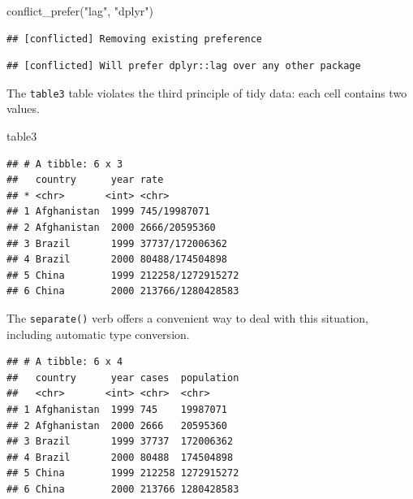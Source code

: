 \documentclass[]{book}
\newenvironment{Shaded}{}{}
\newcommand{\DataTypeTok}[1]{#1}
\newcommand{\KeywordTok}[1]{\textcolor[rgb]{0.00,0.00,1.00}{#1}}
\newcommand{\NormalTok}[1]{#1}
\newcommand{\OperatorTok}[1]{#1}
\newcommand{\StringTok}[1]{\textcolor[rgb]{0.00,0.50,0.50}{#1}}
\begin{document}
\begin{Shaded}
\begin{Highlighting}[]
\KeywordTok{conflict_prefer}\NormalTok{(}\StringTok{"lag"}\NormalTok{, }\StringTok{"dplyr"}\NormalTok{)}
\end{Highlighting}
\end{Shaded}

\begin{verbatim}
## [conflicted] Removing existing preference
\end{verbatim}

\begin{verbatim}
## [conflicted] Will prefer dplyr::lag over any other package
\end{verbatim}

The \texttt{table3} table violates the third principle of tidy data: each cell contains two values.

\begin{Shaded}
\begin{Highlighting}[]
\NormalTok{table3}
\end{Highlighting}
\end{Shaded}

\begin{verbatim}
## # A tibble: 6 x 3
##   country      year rate             
## * <chr>       <int> <chr>            
## 1 Afghanistan  1999 745/19987071     
## 2 Afghanistan  2000 2666/20595360    
## 3 Brazil       1999 37737/172006362  
## 4 Brazil       2000 80488/174504898  
## 5 China        1999 212258/1272915272
## 6 China        2000 213766/1280428583
\end{verbatim}

The \texttt{separate()} verb offers a convenient way to deal with this situation, including automatic type conversion.

\begin{Shaded}
\end{Shaded}

\begin{verbatim}
## # A tibble: 6 x 4
##   country      year cases  population
##   <chr>       <int> <chr>  <chr>     
## 1 Afghanistan  1999 745    19987071  
## 2 Afghanistan  2000 2666   20595360  
## 3 Brazil       1999 37737  172006362 
## 4 Brazil       2000 80488  174504898 
## 5 China        1999 212258 1272915272
## 6 China        2000 213766 1280428583
\end{verbatim}
\end{document}
